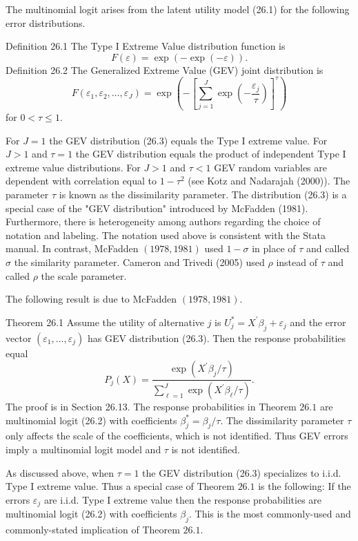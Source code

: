 \documentclass[10pt]{article}
\begin{document}
The multinomial logit arises from the latent utility model (26.1) for the following error distributions.

Definition 26.1 The Type I Extreme Value distribution function is
$$
F(\varepsilon)=\exp (-\exp (-\varepsilon)) .
$$
Definition 26.2 The Generalized Extreme Value (GEV) joint distribution is
$$
F\left(\varepsilon_{1}, \varepsilon_{2}, \ldots, \varepsilon_{J}\right)=\exp \left(-\left[\sum_{j=1}^{J} \exp \left(-\frac{\varepsilon_{j}}{\tau}\right)\right]^{\tau}\right)
$$
for $0<\tau \leq 1$.

For $J=1$ the GEV distribution (26.3) equals the Type I extreme value. For $J>1$ and $\tau=1$ the GEV distribution equals the product of independent Type I extreme value distributions. For $J>1$ and $\tau<1$ GEV random variables are dependent with correlation equal to $1-\tau^{2}$ (see Kotz and Nadarajah (2000)). The parameter $\tau$ is known as the dissimilarity parameter. The distribution (26.3) is a special case of the "GEV distribution" introduced by McFadden (1981). Furthermore, there is heterogeneity among authors regarding the choice of notation and labeling. The notation used above is consistent with the Stata manual. In contrast, McFadden $(1978,1981)$ used $1-\sigma$ in place of $\tau$ and called $\sigma$ the similarity parameter. Cameron and Trivedi (2005) used $\rho$ instead of $\tau$ and called $\rho$ the scale parameter.

The following result is due to McFadden $(1978,1981)$.

Theorem 26.1 Assume the utility of alternative $j$ is $U_{j}^{*}=X^{\prime} \beta_{j}+\varepsilon_{j}$ and the error vector $\left(\varepsilon_{1}, \ldots, \varepsilon_{j}\right)$ has GEV distribution (26.3). Then the response probabilities equal
$$
P_{j}(X)=\frac{\exp \left(X^{\prime} \beta_{j} / \tau\right)}{\sum_{\ell=1}^{J} \exp \left(X^{\prime} \beta_{\ell} / \tau\right)} .
$$
The proof is in Section 26.13. The response probabilities in Theorem $26.1$ are multinomial logit (26.2) with coefficients $\beta_{j}^{*}=\beta_{j} / \tau$. The dissimilarity parameter $\tau$ only affects the scale of the coefficients, which is not identified. Thus GEV errors imply a multinomial logit model and $\tau$ is not identified.

As discussed above, when $\tau=1$ the GEV distribution (26.3) specializes to i.i.d. Type I extreme value. Thus a special case of Theorem $26.1$ is the following: If the errors $\varepsilon_{j}$ are i.i.d. Type I extreme value then the response probabilities are multinomial logit (26.2) with coefficients $\beta_{j}$. This is the most commonly-used and commonly-stated implication of Theorem $26.1$.
\end{document}
